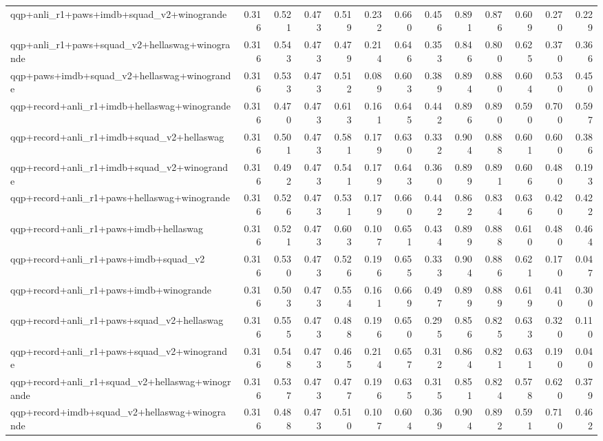 \begin{table}[t]
\begin{tabular}{lrrrrrrrrrrrr}
    qqp+anli\_r1+paws+imdb+squad\_v2+winogrande & 0.316 & 0.521 & 0.473 & 0.519 & 0.232 & 0.660 & 0.456 & 0.891 & 0.876 & 0.609 & 0.270 & 0.229 \\
    qqp+anli\_r1+paws+squad\_v2+hellaswag+winogrande & 0.316 & 0.543 & 0.473 & 0.479 & 0.214 & 0.646 & 0.353 & 0.846 & 0.800 & 0.625 & 0.370 & 0.366 \\
    qqp+paws+imdb+squad\_v2+hellaswag+winogrande & 0.316 & 0.533 & 0.473 & 0.512 & 0.089 & 0.603 & 0.389 & 0.894 & 0.880 & 0.604 & 0.530 & 0.450 \\
    qqp+record+anli\_r1+imdb+hellaswag+winogrande & 0.316 & 0.470 & 0.473 & 0.613 & 0.161 & 0.645 & 0.442 & 0.896 & 0.890 & 0.590 & 0.700 & 0.597 \\
    qqp+record+anli\_r1+imdb+squad\_v2+hellaswag & 0.316 & 0.501 & 0.473 & 0.581 & 0.179 & 0.630 & 0.332 & 0.904 & 0.888 & 0.601 & 0.600 & 0.386 \\
    qqp+record+anli\_r1+imdb+squad\_v2+winogrande & 0.316 & 0.492 & 0.473 & 0.541 & 0.179 & 0.643 & 0.360 & 0.899 & 0.891 & 0.606 & 0.480 & 0.193 \\
    qqp+record+anli\_r1+paws+hellaswag+winogrande & 0.316 & 0.526 & 0.473 & 0.531 & 0.179 & 0.660 & 0.442 & 0.862 & 0.834 & 0.636 & 0.420 & 0.422 \\
    qqp+record+anli\_r1+paws+imdb+hellaswag & 0.316 & 0.521 & 0.473 & 0.603 & 0.107 & 0.651 & 0.434 & 0.899 & 0.888 & 0.610 & 0.480 & 0.464 \\
    qqp+record+anli\_r1+paws+imdb+squad\_v2 & 0.316 & 0.530 & 0.473 & 0.526 & 0.196 & 0.655 & 0.333 & 0.904 & 0.886 & 0.621 & 0.170 & 0.047 \\
    qqp+record+anli\_r1+paws+imdb+winogrande & 0.316 & 0.503 & 0.473 & 0.554 & 0.161 & 0.669 & 0.497 & 0.899 & 0.889 & 0.619 & 0.410 & 0.300 \\
    qqp+record+anli\_r1+paws+squad\_v2+hellaswag & 0.316 & 0.555 & 0.473 & 0.488 & 0.196 & 0.650 & 0.295 & 0.856 & 0.825 & 0.633 & 0.320 & 0.110 \\
    qqp+record+anli\_r1+paws+squad\_v2+winogrande & 0.316 & 0.548 & 0.473 & 0.465 & 0.214 & 0.657 & 0.312 & 0.864 & 0.821 & 0.631 & 0.190 & 0.040 \\
    qqp+record+anli\_r1+squad\_v2+hellaswag+winogrande & 0.316 & 0.537 & 0.473 & 0.477 & 0.196 & 0.635 & 0.315 & 0.851 & 0.824 & 0.578 & 0.620 & 0.379 \\
    qqp+record+imdb+squad\_v2+hellaswag+winogrande & 0.316 & 0.488 & 0.473 & 0.510 & 0.107 & 0.604 & 0.369 & 0.904 & 0.892 & 0.591 & 0.710 & 0.462 \\

\end{tabular}
\end{table}
